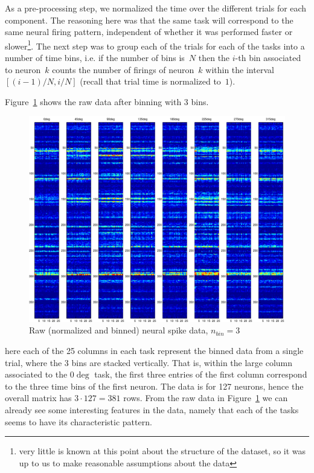 \documentclass{../../common/projectreport}
\begin{document}
As a pre-processing step, we normalized the time over the different trials for each component. The reasoning here was that the same task will correspond to the same neural firing pattern, independent of whether it was performed faster or slower\footnote{very little is known at this point about the structure of the dataset, so it was up to us to make reasonable assumptions about the data}. The next step was to group each of the trials for each of the tasks into a number of time bins, i.e. if the number of bins is~$N$ then the $i$-th bin associated to neuron~$k$ counts the number of firings of neuron~$k$ within the interval~$[(i-1)/N, i/N]$ (recall that trial time is normalized to~$1$). 

Figure~\ref{Applications:RPCAapps:BMI:raw3bins} shows the raw data after binning with 3 bins. 
%
\begin{figure}[h]
\centering
\includegraphics[width=\textwidth]{../figures/BMI_raw_3bins}
\caption{Raw (normalized and binned) neural spike data, $n_{bin}=3$}
\label{Applications:RPCAapps:BMI:raw3bins}
\end{figure}
%
here each of the 25 columns in each task represent the binned data from a single trial, where the 3 bins are stacked vertically. That is, within the large column associated to the $0\deg$ task, the first three entries of the first column correspond to the three time bins of the first neuron. The data is for 127 neurons, hence the overall matrix has $3\cdot127= 381$ rows. From the raw data in Figure~\ref{Applications:RPCAapps:BMI:raw3bins} we can already see some interesting features in the data, namely that each of the tasks seems to have its characteristic pattern. 
\end{document}
